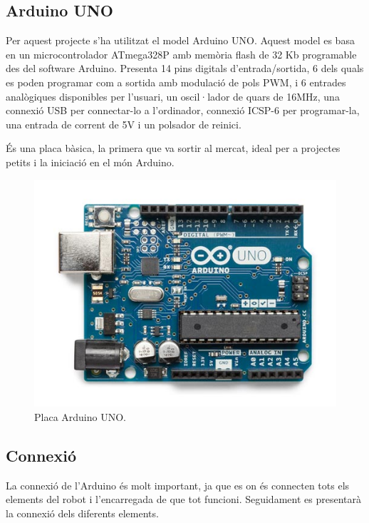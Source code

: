 \subsection{Arduino UNO}

Per aquest projecte s’ha utilitzat el model Arduino UNO. Aquest model  es basa en un microcontrolador ATmega328P amb memòria flash de 32 Kb programable des del software Arduino. Presenta 14 pins digitals d’entrada/sortida, 6 dels quals es poden programar com a sortida amb modulació de pols PWM, i 6 entrades analògiques disponibles per l’usuari, un oscil·lador de quars de 16MHz, una connexió USB per connectar-lo a l’ordinador, connexió ICSP-6 per programar-la, una entrada de corrent de 5V i un polsador de reinici. 

És una placa bàsica, la primera que va sortir al mercat, ideal per a projectes petits i la iniciació en el món Arduino.

\begin{figure}[H]
	\centering
	\includegraphics[scale=0.5]{arduino-uno.png}
	\caption{Placa Arduino UNO.}
	\label{fig:arduinouno}
\end{figure}

\subsection{Connexió}\label{sec:connexio}

La connexió de l’Arduino és molt important, ja que es on és connecten tots els elements del robot i l’encarregada de que tot funcioni. Seguidament es presentarà la connexió dels diferents elements.


